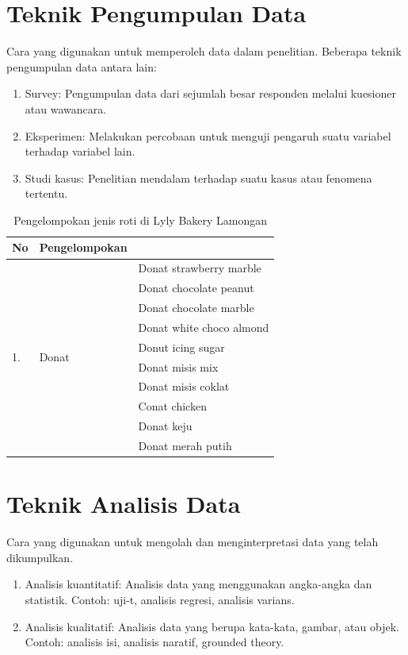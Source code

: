 \documentclass[english,12pt,a4paper]{book}
\begin{document}
\section{Teknik Pengumpulan Data}
Cara yang digunakan untuk memperoleh data dalam penelitian. Beberapa teknik pengumpulan data antara lain:
\begin{enumerate}
	\item Survey: Pengumpulan data dari sejumlah besar responden melalui kuesioner atau wawancara.
	\item Eksperimen: Melakukan percobaan untuk menguji pengaruh suatu variabel terhadap variabel lain.
	\item Studi kasus: Penelitian mendalam terhadap suatu kasus atau fenomena tertentu.
\end{enumerate}
\begin{table}[h!]
	\centering
	\caption{Pengelompokan jenis roti di Lyly Bakery Lamongan}
	\begin{tabular}{|l|l|l|}
		\hline
		No                    & Pengelompokan                       &                               \\ \hline
		\multirow{10}{*}{1.}  & \multirow{10}{*}{Donat}             & Donat strawberry marble      \\ \cline{3-3} 
		&                                     & Donat chocolate peanut       \\ \cline{3-3} 
		&                                     & Donat chocolate marble       \\ \cline{3-3} 
		&                                     & Donat white choco almond     \\ \cline{3-3} 
		&                                     & Donut icing sugar            \\ \cline{3-3} 
		&                                     & Donat misis mix              \\ \cline{3-3} 
		&                                     & Donat misis coklat           \\ \cline{3-3} 
		&                                     & Conat chicken                \\ \cline{3-3} 
		&                                     & Donat keju                   \\ \cline{3-3} 
		&                                     & Donat merah putih            \\ \hline
	\end{tabular}
\end{table}
\section{Teknik Analisis Data}
Cara yang digunakan untuk mengolah dan menginterpretasi data yang telah dikumpulkan.
\begin{enumerate}
	\item Analisis kuantitatif: Analisis data yang menggunakan angka-angka dan statistik. Contoh: uji-t, analisis regresi, analisis varians.
	\item Analisis kualitatif: Analisis data yang berupa kata-kata, gambar, atau objek. Contoh: analisis isi, analisis naratif, grounded theory.
\end{enumerate}
\end{document}
